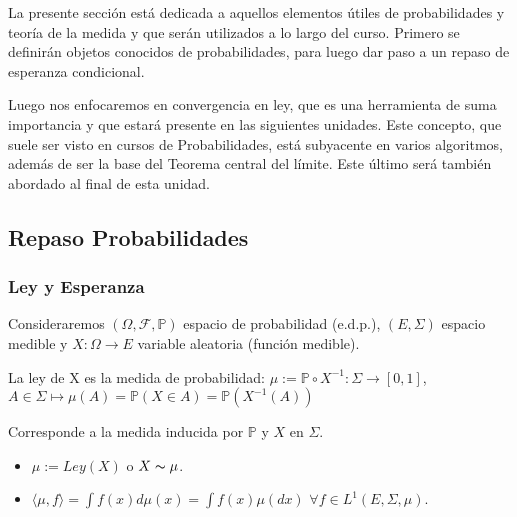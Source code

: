La presente sección está dedicada a aquellos elementos útiles de probabilidades y teoría de la medida y que serán utilizados a lo largo del curso. Primero se definirán objetos conocidos de probabilidades, para luego dar paso a un repaso de esperanza condicional.

\newp Luego nos enfocaremos en convergencia en ley, que es una herramienta de suma importancia y que estará presente en las siguientes unidades. Este concepto, que suele ser visto en cursos de Probabilidades, está subyacente en varios algoritmos, además de ser la base del Teorema central del límite. Este último será también abordado al final de esta unidad.

\subsection{Repaso Probabilidades}
\subsubsection{Ley y Esperanza}

Consideraremos $(\Omega,\mathcal{F},\mathbb{P})$ espacio de probabilidad (e.d.p.), $(E,\Sigma)$ espacio medible y $X: \Omega \longrightarrow E$ variable aleatoria (función medible).

\begin{definition}[Ley de X]
La ley de X es la medida de probabilidad:
$\mu := \mathbb{P} \circ X^{-1}: \Sigma \longrightarrow [0,1]$, $A \in \Sigma \longmapsto \mu(A)=\mathbb{P}(X \in A)=\mathbb{P}(X^{-1}(A))$

Corresponde a la medida inducida por $\mathbb{P}$ y $X$ en $\Sigma$.
\end{definition}

\begin{notation}
\beforeitemize
\begin{itemize}
    \item $\mu:=Ley(X)$ o $X\thicksim \mu$.
    \item $\langle \mu, f \rangle = \int f(x) d\mu(x) = \int f(x)\mu(dx)$ $\forall f \in L^1(E,\Sigma,\mu)$.
\end{itemize}
\end{notation}

